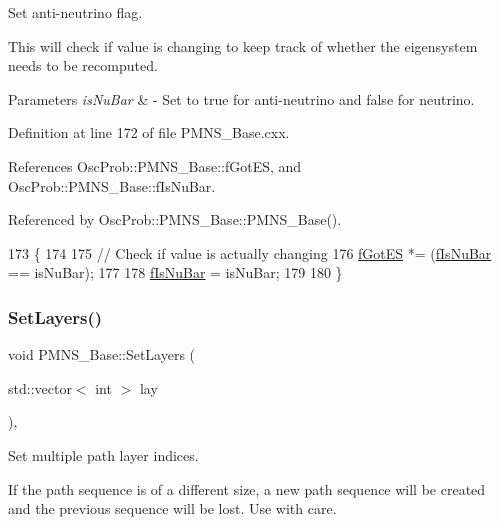 Set anti-\/neutrino flag.

This will check if value is changing to keep track of whether the eigensystem needs to be recomputed.


\begin{DoxyParams}{Parameters}
{\em is\+Nu\+Bar} & -\/ Set to true for anti-\/neutrino and false for neutrino. \\
\hline
\end{DoxyParams}


Definition at line 172 of file P\+M\+N\+S\+\_\+\+Base.\+cxx.



References Osc\+Prob\+::\+P\+M\+N\+S\+\_\+\+Base\+::f\+Got\+ES, and Osc\+Prob\+::\+P\+M\+N\+S\+\_\+\+Base\+::f\+Is\+Nu\+Bar.



Referenced by Osc\+Prob\+::\+P\+M\+N\+S\+\_\+\+Base\+::\+P\+M\+N\+S\+\_\+\+Base().


\begin{DoxyCode}
173 \{
174 
175   \textcolor{comment}{// Check if value is actually changing}
176   \hyperlink{classOscProb_1_1PMNS__Base_a6dc5cd010d2d70b2324745b4e53e9839}{fGotES} *= (\hyperlink{classOscProb_1_1PMNS__Base_a0ebaeaefab36a3ff381c6293faedfdd6}{fIsNuBar} == isNuBar);
177 
178   \hyperlink{classOscProb_1_1PMNS__Base_a0ebaeaefab36a3ff381c6293faedfdd6}{fIsNuBar} = isNuBar;
179 
180 \}
\end{DoxyCode}
\mbox{\label{classOscProb_1_1PMNS__Base_a904e580edf89fb98bf9a6397739b4ebe}} 
\subsubsection{\texorpdfstring{Set\+Layers()}{SetLayers()}}
{\footnotesize\ttfamily void P\+M\+N\+S\+\_\+\+Base\+::\+Set\+Layers (\begin{DoxyParamCaption}\item[{std\+::vector$<$ int $>$}]{lay }\end{DoxyParamCaption})\hspace{0.3cm}{\ttfamily [virtual]}, {\ttfamily [inherited]}}

Set multiple path layer indices.

If the path sequence is of a different size, a new path sequence will be created and the previous sequence will be lost. Use with care.


